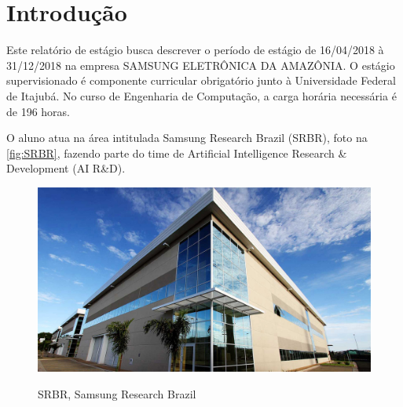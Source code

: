 \documentclass[
	12pt,				%
    oneside,			%
	a4paper,			%
	english,			%
	french,				%
	spanish,			%
	brazil				%
	]{abntex2}
\begin{document}

\frenchspacing

\imprimircapa
\imprimirfolhaderosto*

\tableofcontents*
\clearpage

\textual

\chapter{Introdução}

Este relatório de estágio busca descrever o período de estágio de 16/04/2018 à 31/12/2018 na empresa SAMSUNG ELETRÔNICA DA AMAZÔNIA. O estágio supervisionado é componente curricular obrigatório junto à Universidade Federal de Itajubá. No curso de Engenharia de Computação, a carga horária necessária é de 196 horas.

O aluno atua na área intitulada Samsung Research Brazil (SRBR), foto na \autoref{fig:SRBR}, fazendo parte do time de Artificial Intelligence Research \& Development (AI R\&D).

\begin{figure}[H]
  \centering
  \includegraphics[width=400pt]{images/srbr-image.jpg}\\
  \caption[SRBR, Samsung Research Brazil]{SRBR, Samsung Research Brazil}
  \label{fig:SRBR}
\end{figure}
\end{document}
